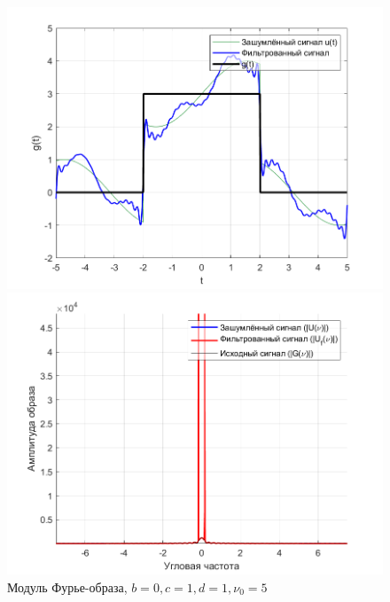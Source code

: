 \documentclass[a4paper]{article}
\begin{document}
\begin{figure}[H]
    \begin{minipage}{0.5\textwidth}
        \centering
        \includegraphics[width=\textwidth]{part2/0_1_1.png}
        \caption{$b = 0, c = 1, d = 1, \nu_0 = 5$}
    \end{minipage}    
    \begin{minipage}{0.5\textwidth}
        \centering
        \includegraphics[width=\textwidth]{part2/0_1_1_Fourier.png}
        \caption{Модуль Фурье-образа, $b = 0, c = 1, d = 1, \nu_0 = 5$}
    \end{minipage}
\end{figure}\
\end{document}
